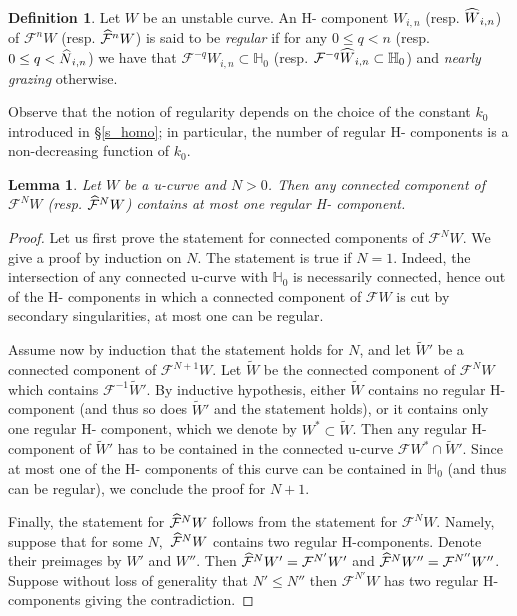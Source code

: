 \documentclass[10pt]{amsart}
\newtheorem{lemm}[theo]{Lemma}\newtheorem{prop}[theo]{Proposition}\newtheorem{coro}[theo]{Corollary}\newtheorem{conj}[theo]{Conjecture}
\theoremstyle{definition}\newtheorem{defi}[theo]{Definition}\newtheorem{rema}[theo]{Remark}\newtheorem{exam}[theo]{Example}\newtheorem{exem}[theo]{Example}\newtheorem{nota}[theo]{Notation}
\newcommand{\inv}{^{-1}}
\newcommand{\homo}{\mathbb{H}}
\newcommand{\cm}{\mathcal{F}}
\newcommand{\cmp}{\hat\cm}
\newcommand{\Hcomp}{H-\hskip0pt component}
\newcommand{\Hcomps}{H-\hskip0pt components}
\newcommand{\Np}{\hat N}
\let\oldhat\hat
\renewcommand*{\hat}[1]{\mathchoice{\widehat{#1}}{\widehat{#1}}{\oldhat{#1}}{\oldhat{#1}}}
\begin{document}
\begin{defi}
Let $W$ be an unstable curve. An \Hcomp{} $W_{i,n}$ (resp. $\hat W_{i,n}$) of $\cm^n W$ (resp. $\cmp^n W$) is said to be
\emph{regular} if for any $0 \le q < n$ (resp. $0\le q < \Np_{i,n}$) we have that $\cm^{-q}W_{i,n}\subset \homo_0$ (resp. $\cm^{-q}\hat W_{i,n}\subset \homo_0$) and \emph{nearly grazing} otherwise.
\end{defi}

Observe that the notion of regularity depends on the choice of the constant $k_0$ introduced in \S\ref{s_homo}; in particular, the number of regular \Hcomps{} is a non-decreasing function of $k_{0}$.
\begin{lemm}\label{l_atMostOne1}
Let $W$ be a u-curve and $N > 0$. Then any connected component of $\cm^NW$ (resp. $\cmp^NW$) contains at most one regular \Hcomp{}.
\end{lemm}
\begin{proof}
Let us first prove the statement for connected components of $\cm^NW.$ We give a proof by induction on $N$. The statement is true if $N = 1$. Indeed, the intersection of any connected u-curve with $\homo_0$ is necessarily connected, hence out of the \Hcomps{} in which a connected component of $\cm W$ is cut by secondary singularities, at most one can be regular.

Assume now by induction that the statement holds for $N$, and let $\widetilde W'$ be a connected component of $\cm^{N+1}W$. Let $\widetilde W$ be the connected component of $\cm^N W$ which contains $\cm\inv \widetilde W'$. By inductive hypothesis, either $\widetilde W$ contains no regular \Hcomp{} (and thus so does $\widetilde W'$ and the statement holds), or it contains only one regular \Hcomp{}, which we denote by $W^*\subset\widetilde W$. Then any regular \Hcomp{} of $\widetilde W'$ has to be contained in the connected u-curve $\cm W^*\cap \widetilde W'$. Since at most one of the \Hcomps{} of this curve can be contained in $\homo_0$ (and thus can be regular), we conclude the proof for $N+1$.

Finally, the statement for $\cmp^NW$ follows from the statement for $\cm^NW$. Namely, suppose that for some $N,$ $\cmp^N W$ contains two regular H-components. Denote their preimages by $W'$ and $W''$. Then $\cmp^N W'=\cm^{N'} W'$ and $\cmp^N W''=\cm^{N''} W''$. Suppose without loss of generality that $N'\leq N''$ then $\cm^{N'} W$ has two regular H-components giving the contradiction.
\end{proof}
\end{document}

